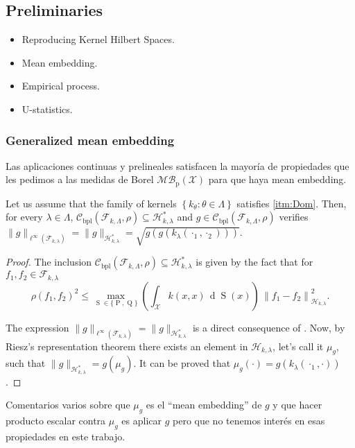 	\subsection{Preliminaries}
		\begin{itemize}
			\item Reproducing Kernel Hilbert Spaces.
			\item Mean embedding.
			\item Empirical process.
			\item U-statistics.
		\end{itemize}
		\subsubsection*{Generalized mean embedding}
			{\color{orange}Las aplicaciones continuas y prelineales satisfacen la mayor\'{i}a de propiedades que les pedimos a las medidas de Borel $\mathcal{MB}_{\operatorname{p}}(\mathcal{X})$ para que haya mean embedding.}
			\begin{Lema}
				Let us assume that the family of kernels $\left\{k_{\theta}:\theta\in\Lambda\right\}$ satisfies \ref{itm:Dom}. Then, for every $\lambda\in\Lambda$, $\mathcal{C}_{\operatorname{bpl}}\left(\mathcal{F}_{k,\Lambda},\rho\right)\subseteq\mathcal{H}_{k,\lambda}^{\ast}$ and  $g\in\mathcal{C}_{\operatorname{bpl}}\left(\mathcal{F}_{k,\Lambda},\rho\right)$ verifies $\|g\|_{\ell^{\infty}\left(\mathcal{F}_{k,\lambda}\right)}=\|g\|_{\mathcal{H}_{k,\lambda}^{\ast}}=\sqrt{g\left(g\left(k_{\lambda}\left(\cdot_{1},\cdot_{2}\right)\right)\right)}$. 
			\end{Lema}
			\begin{proof}
				The inclusion $\mathcal{C}_{\operatorname{bpl}}\left(\mathcal{F}_{k,\Lambda},\rho\right)\subseteq\mathcal{H}_{k,\lambda}^{\ast}$ is given by the fact that for $f_{1},f_{2}\in\mathcal{F}_{k,\lambda}$
				\begin{equation}
					\rho\left(f_{1},f_{2}\right)^{2}\leq\underset{\operatorname{S}\in\{\operatorname{P},\operatorname{Q}\}}{\operatorname{max}}\left(\int_{\mathcal{X}}k(x,x)\,\operatorname{d}\!\operatorname{S}(x)\right)\,\left\|f_{1}-f_{2}\right\|_{\mathcal{H}_{k,\lambda}}^{2}.
				\end{equation}
				
				The expression $\|g\|_{\ell^{\infty}\left(\mathcal{F}_{k,\lambda}\right)}=\|g\|_{\mathcal{H}_{k,\lambda}^{\ast}}$ is a direct consequence of \textcite[Lemma 2.30, p. 88]{Dudley1999}. Now, by Riesz's representation theorem there exists an element in $\mathcal{H}_{k,\lambda}$, let's call it $\mu_{g}$, such that $\|g\|_{\mathcal{H}_{k,\lambda}^{\ast}}=g\left(\mu_{g}\right)$. {\color{orange}It can be proved that $\mu_{g}(\cdot)=g\left(k_{\lambda}\left(\cdot_{1},\cdot\right)\right)$.}
			\end{proof}
			{\color{orange}Comentarios varios sobre que $\mu_{g}$ es el \enquote{mean embedding} de $g$ y que hacer producto escalar contra $\mu_{g}$ es aplicar $g$ pero que no tenemos inter\'{e}s en esas propiedades en este trabajo.}
